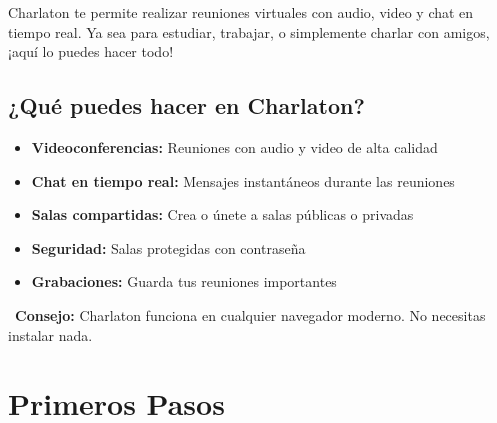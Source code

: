 \documentclass[11pt,a4paper]{article}
\begin{document}
\begin{center}
\end{center}

\vspace{0.5cm}

Charlaton te permite realizar reuniones virtuales con audio, video y chat en tiempo real. Ya sea para estudiar, trabajar, o simplemente charlar con amigos, ¡aquí lo puedes hacer todo!

\subsection{¿Qué puedes hacer en Charlaton?}

\begin{itemize}[leftmargin=2cm]
    \item[\color{charlatonCyan}\faVideo] \textbf{Videoconferencias:} Reuniones con audio y video de alta calidad
    \item[\color{charlatonBlue}\faComments] \textbf{Chat en tiempo real:} Mensajes instantáneos durante las reuniones
    \item[\color{charlatonOrange}\faUsers] \textbf{Salas compartidas:} Crea o únete a salas públicas o privadas
    \item[\color{charlatonCyan}\faLock] \textbf{Seguridad:} Salas protegidas con contraseña
    \item[\color{charlatonBlue}\faRecordVinyl] \textbf{Grabaciones:} Guarda tus reuniones importantes
\end{itemize}

\begin{tipbox}
    \faLightbulb\ \textbf{Consejo:} Charlaton funciona en cualquier navegador moderno. No necesitas instalar nada.
\end{tipbox}

\section{Primeros Pasos \faRocket}
\end{document}
